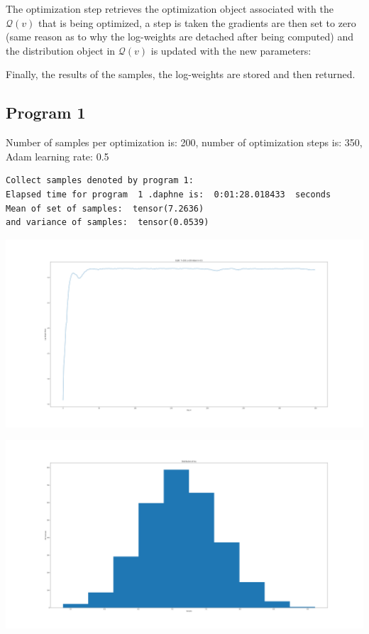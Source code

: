 \documentclass[]{article}
\begin{document}
  
 The optimization step retrieves the optimization object associated with the $\mathcal{Q}(v)$ that is being optimized, a step is taken the gradients are then set to zero (same reason as to why the log-weights are detached after being computed) and the distribution object in $\mathcal{Q}(v)$ is updated with the new parameters:
 
 Finally, the results of the samples, the log-weights are stored and then returned.
\subsection{Program 1}
Number of samples per optimization is: 200, number of optimization steps is: 350, Adam learning rate: 0.5
\begin{verbatim}
Collect samples denoted by program 1:
Elapsed time for program  1 .daphne is:  0:01:28.018433  seconds
Mean of set of samples:  tensor(7.2636) 
and variance of samples:  tensor(0.0539)	
\end{verbatim}
\begin{center}
	\includegraphics[width=\linewidth]{Figures/elbo_1Adam7.png}
\end{center}
\begin{center}
	\includegraphics[width=\linewidth]{Figures/distMu_1_3.png}
\end{center}
\end{document}
